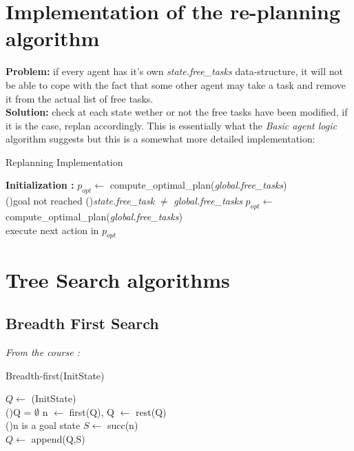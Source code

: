 \documentclass[11pt]{article}
\begin{document}
\section{Implementation of the re-planning algorithm}

\textbf{Problem: }if every agent has it's own \emph{state.free\_tasks} data-structure, it will not be able to cope with the fact that some other agent may take a task and remove it from the actual list of free tasks.\\
\textbf{Solution: }check at each state wether or not the free tasks have been modified, if it is the case, replan accordingly. This is essentially what the \emph{Basic agent logic} algorithm suggests but this is a somewhat more detailed implementation:

\begin{algorithm}
    \SetAlgoLined
    \caption{Replanning Implementation}
    \textbf{Initialization :} $p_{opt}\leftarrow $ compute\_optimal\_plan(\emph{global.free\_tasks})  \\
    \While(){goal not reached}{
        \If(){\emph{state.free\_task} $\neq$ \emph{global.free\_tasks}}{
            $p_{opt} \leftarrow$ compute\_optimal\_plan(\emph{global.free\_tasks}) \\
        }
        execute next action in $p_{opt}$
    }
\end{algorithm}

\section{Tree Search algorithms}

\subsection{Breadth First Search}

\emph{From the course : }

\begin{algorithm}[H]
    \caption{Breadth-first(InitState)}
    \SetAlgoLined
    $Q \leftarrow$ (InitState) \\
    \Repeat(){Q = $\emptyset$}{
        n $\leftarrow$ first(Q), Q $\leftarrow$ rest(Q) \\
        \If(){n is a goal state}{
        }
        $S \leftarrow$ succ(n) \\
        $Q \leftarrow$ append(Q,S)
    }
\end{algorithm}
\end{document}
